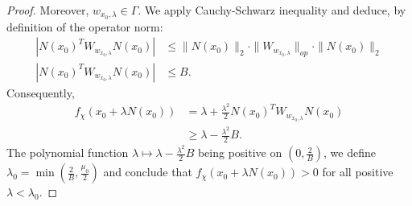 \begin{proof}
Moreover, $w_{x_0, \lambda} \in \Gamma$. We apply Cauchy-Schwarz inequality and deduce, by definition of the operator norm: 
\begin{equation*}
    \begin{split}
        |N(x_0)^T W_{w_{x_0, \lambda}} N(x_0)| & \leq \|N(x_0)\|_2 \cdot \| W_{w_{x_0, \lambda}}\|_{op} \cdot \|N(x_0)\|_2 \\
        |N(x_0)^T W_{w_{x_0, \lambda}} N(x_0)| & \leq B.
    \end{split}
\end{equation*}
%
Consequently,
\begin{equation*}
    \begin{split}
        f_\chi(x_0 + \lambda N(x_0)) & = \lambda + \frac{\lambda^2}{2} N(x_0)^T W_{w_{x_0, \lambda}} N(x_0)\\
        & \geq \lambda - \frac{\lambda^2}{2} B.
    \end{split}
\end{equation*}
The polynomial function $\lambda\mapsto \lambda - \frac{\lambda^2}{2}B$ being positive on $(0,\frac{2}{B})$, we define $\lambda_0=\min(\frac{2}{B}, \frac{\mu_0}{2})$ and conclude that $f_\chi(x_0 + \lambda N(x_0)) > 0$ for all positive $\lambda<\lambda_0$.
\end{proof}


